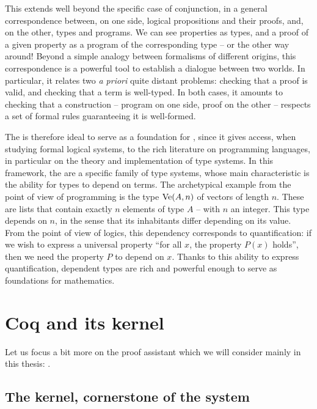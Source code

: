 This extends well beyond the specific case of conjunction, in a general correspondence
between, on one side, logical propositions and their proofs, and, on the other, types and programs.
We can see properties as types, and a proof of a given property as a program of the
corresponding type – or the other way around!
Beyond a simple analogy between formalisms of different origins, this correspondence
is a powerful tool to establish a dialogue between two worlds. In particular, it
relates two \textit{a priori} quite distant problems: checking that a proof
is valid, and checking that a term is well-typed. In both cases, it amounts to checking that
a construction – program on one side, proof on the other – respects a set of formal
rules guaranteeing it is well-formed.

The  is therefore ideal to serve as a foundation for
, since it gives access, when studying formal logical systems,
to the rich literature on programming languages, in particular on the theory and
implementation of type systems. In this framework, the
 are a specific family of type systems,
whose main characteristic is the ability for types to depend on terms. The archetypical
example from the point of view of programming is the type $\operatorname{Ve}(A,n)$
of vectors of length $n$. These are lists that contain exactly $n$ elements of type $A$ – with
$n$ an integer.
This type depends on $n$, in the sense that its inhabitants differ depending on its value.
From the point of view of logics, this dependency corresponds to quantification: if we
wish to express a universal property “for all $x$, the property $P(x)$ holds”, then we need
the property $P$ to depend on $x$.
Thanks to this ability to express quantification, dependent types are rich and powerful enough
to serve as foundations for mathematics.

\section{Coq and its kernel}
\label{sec:intro-coq-en}

Let us focus a bit more on the proof assistant which we will consider mainly in this
thesis: .

\subsection[The kernel]{The kernel, cornerstone of the system}

